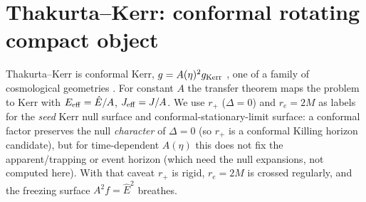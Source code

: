 \documentclass[
    aps, prd, twocolumn, superscriptaddress,
    showpacs, nofootinbib, floatfix
]{revtex4-2}
\newcommand{\Ehat}{\hat E}
\newcommand{\rp}{r_{+}}
\newcommand{\re}{r_{e}}
\begin{document}
\section{Thakurta--Kerr: conformal rotating compact object}
\label{sec:thakurta}
Thakurta--Kerr is conformal Kerr, $g=A(\eta)^2 g_{\rm Kerr}$
\cite{Thakurta1981,Kerr1963}, one of a family of cosmological geometries
\cite{McVittie1933,SultanaDyer2005,Kaloper2010,NolanMcVittie1998,MelloMaciel2017,FaraoniBook}.
For constant $A$
the transfer theorem maps the problem to Kerr with $E_{\rm eff}=\Ehat/A$,
$J_{\rm eff}=J/A$. We use $\rp$ ($\Delta=0$) and $\re=2M$ as labels for the \emph{seed}
Kerr null surface and conformal-stationary-limit surface: a conformal factor preserves
the null \emph{character} of $\Delta=0$ (so $\rp$ is a conformal Killing horizon
candidate), but for time-dependent $A(\eta)$ this does not fix the apparent/trapping or
event horizon (which need the null expansions, not computed here). With that caveat
$\rp$ is rigid, $\re=2M$ is crossed regularly, and the freezing surface
$A^2 f=\Ehat^2$ breathes.
\end{document}
